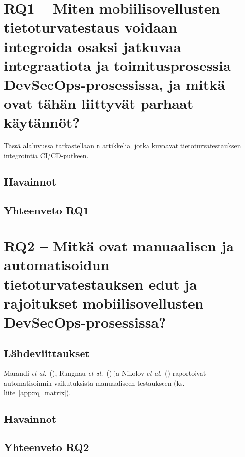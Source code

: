 \documentclass[bscthesis,finnish,oneside,biblatex]{uefcsthesis}
\begin{document}
\begin{description}
    \item[\cite{chung2024_devsecops}]
\end{description}

\section{RQ1 – Miten mobiilisovellusten tietoturvatestaus voidaan integroida osaksi jatkuvaa integraatiota ja toimitusprosessia DevSecOps-prosessissa, ja mitkä ovat tähän liittyvät parhaat käytännöt?}
\label{sec:rq1}

Tässä alaluvussa tarkastellaan n artikkelia, jotka kuvaavat
tietoturvatestauksen integrointia CI/CD-putkeen.

\subsection{Havainnot}

\subsection{Yhteenveto RQ1}

\section{RQ2 – Mitkä ovat manuaalisen ja automatisoidun tietoturvatestauksen edut ja rajoitukset mobiilisovellusten DevSecOps-prosessissa?}
\label{sec:rq2}

\subsection{Lähdeviittaukset}
Marandi \emph{et al.}\ (\citeyear{marandi2023_ias}),
Rangnau \emph{et al.}\ (\citeyear{putra2022_devsecops}) ja
Nikolov \emph{et al.}\ (\citeyear{rangnau2020_cst}) raportoivat automatisoinnin
vaikutuksista manuaaliseen testaukseen (ks. liite~\ref{app:rq_matrix}).

\subsection{Havainnot}

\subsection{Yhteenveto RQ2}
\end{document}
